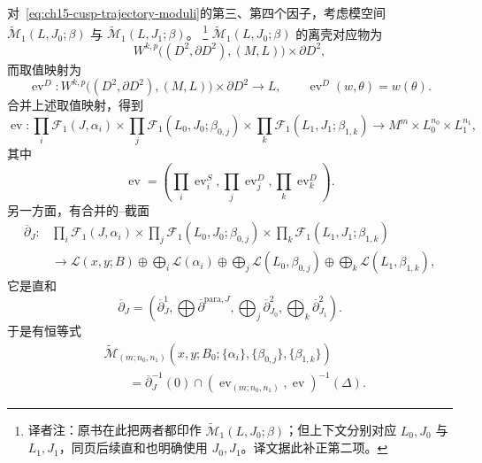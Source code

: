 对~\eqref{eq:ch15-cusp-trajectory-moduli}的第三、第四个因子，考虑模空间
$\widetilde{\mathcal M}_1(L,J_0;\beta)$ 与
$\widetilde{\mathcal M}_1(L,J_1;\beta)$。
\footnote{译者注：原书在此把两者都印作
$\widetilde{\mathcal M}_1(L,J_0;\beta)$；但上下文分别对应 $L_0,J_0$ 与
$L_1,J_1$，同页后续直和也明确使用 $J_0,J_1$。译文据此补正第二项。}
$\widetilde{\mathcal M}_1(L,J_0;\beta)$ 的离壳对应物为
\[
 W^{k,p}\bigl((D^2,\partial D^2),(M,L)\bigr)\times\partial D^2,
\]
而取值映射为
\[
 \operatorname{ev}^{D}:W^{k,p}\bigl((D^2,\partial D^2),(M,L)\bigr)
 \times\partial D^2\longrightarrow L,
 \qquad \operatorname{ev}^{D}(w,\theta)=w(\theta).
\]
合并上述取值映射，得到
\begin{equation}
 \operatorname{ev}:
 \prod_i\mathcal F_1(J,\alpha_i)
 \times\prod_j\mathcal F_1(L_0,J_0;\beta_{0,j})
 \times\prod_k\mathcal F_1(L_1,J_1;\beta_{1,k})
 \longrightarrow M^m\times L_0^{n_0}\times L_1^{n_1},
 \label{eq:combined-bubble-evaluation}
\end{equation}
其中
\[
 \operatorname{ev}=(\prod_i\operatorname{ev}_i^S,
 \prod_j\operatorname{ev}_j^D,\prod_k\operatorname{ev}_k^D).
\]
另一方面，有合并的\personCauchy{}--\personRiemann{}截面
\begin{equation}
\begin{aligned}
 \overline\partial_J:
 &\prod_i\mathcal F_1(J,\alpha_i)
 \times\prod_j\mathcal F_1(L_0,J_0;\beta_{0,j})
 \times\prod_k\mathcal F_1(L_1,J_1;\beta_{1,k})\\
 &\longrightarrow
 \mathcal L(x,y;B)\oplus\bigoplus_i\mathcal L(\alpha_i)
 \oplus\bigoplus_j\mathcal L(L_0,\beta_{0,j})
 \oplus\bigoplus_k\mathcal L(L_1,\beta_{1,k}),
\end{aligned}
\label{eq:combined-cauchy-riemann-section}
\end{equation}
它是直和
\[
 \overline\partial_J=
 \left(\overline\partial_J^1,
 \bigoplus\overline\partial^{\mathrm{para},J},
 \bigoplus_j\overline\partial_{J_0}^2,
 \bigoplus_k\overline\partial_{J_1}^2\right).
\]
于是有恒等式
\begin{equation}
\begin{aligned}
 &\widetilde{\mathcal M}_{(m;n_0,n_1)}
 (x,y;B_0;\{\alpha_i\},\{\beta_{0,j}\},\{\beta_{1,k}\})\\
 &\qquad=\overline\partial_J^{-1}(0)
 \cap(\operatorname{ev}_{(m;n_0,n_1)},\operatorname{ev})^{-1}(\Delta).
\end{aligned}
\label{eq:cusp-space-zero-set-fiber-product}
\end{equation}

